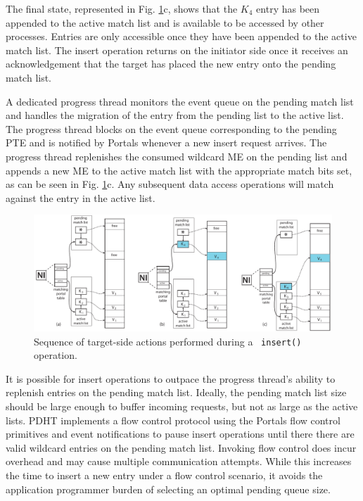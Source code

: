 The final state, represented in Fig. \ref{fig:put}c, shows that the $K_4$ entry
has been appended to the active match list and is available to be accessed by
other processes. Entries are only accessible once they have been appended to
the active match list. The insert operation returns on the initiator side once
it receives an acknowledgement that the target has placed the new entry onto
the pending match list. 

A dedicated progress thread monitors the event queue on
the pending match list and handles the migration of the entry from the pending
list to the active list. The progress thread blocks on the event queue
corresponding to the pending PTE and is notified by Portals whenever a new
insert request arrives. The progress thread replenishes the consumed wildcard
ME on the pending list and appends a new ME to the active match list with the
appropriate match bits set, as can be seen in Fig. \ref{fig:put}c. Any
subsequent data access operations will match against the entry in the active
list.

\begin{figure}
  \centering
  \includegraphics[width=0.85\linewidth]{figs/put}
  \caption{Sequence of target-side actions performed during a \pdht~{\tt insert()} operation.}
  \label{fig:put}
\end{figure}

It is possible for insert operations to outpace the progress thread's ability
to replenish entries on the pending match list. Ideally, the pending match list
size should be large enough to buffer incoming requests, but not as large as
the active lists. PDHT implements a flow control protocol using the Portals
flow control primitives and event notifications to pause insert operations
until there there are valid wildcard entries on the pending match list.
Invoking flow control does incur overhead and may cause multiple communication
attempts. While this increases the time to insert a new entry under a flow
control scenario, it avoids the application programmer burden of selecting an
optimal pending queue size.

